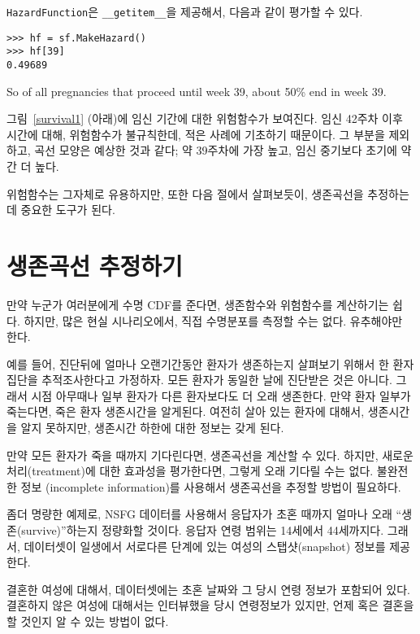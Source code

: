 {\tt HazardFunction}은 \verb"__getitem__"을 제공해서, 다음과 같이 평가할 수 있다.

\begin{verbatim}
>>> hf = sf.MakeHazard()
>>> hf[39]
0.49689
\end{verbatim}

So of all pregnancies that proceed until week 39, about
50\% end in week 39.

그림~\ref{survival1} (아래)에 임신 기간에 대한 위험함수가 보여진다.
임신 42주차 이후 시간에 대해, 위험함수가 불규칙한데, 적은 사례에 기초하기 때문이다. 그 부분을 제외하고, 곡선 모양은 예상한 것과 같다; 약 39주차에 가장 높고, 임신 중기보다 초기에 약간 더 높다.


위험함수는 그자체로 유용하지만, 또한 다음 절에서 살펴보듯이, 생존곡선을 추정하는데 중요한 도구가 된다.

\section{생존곡선 추정하기}

만약 누군가 여러분에게 수명 CDF를 준다면, 생존함수와 위험함수를 계산하기는 쉽다. 하지만, 많은 현실 시나리오에서, 직접 수명분포를 측정할 수는 없다.
유추해야만 한다.

예를 들어, 진단뒤에 얼마나 오랜기간동안 환자가 생존하는지 살펴보기 위해서 한 환자집단을 추적조사한다고 가정하자.
모든 환자가 동일한 날에 진단받은 것은 아니다. 그래서 시점 아무때나 일부 환자가 다른 환자보다도 더 오래 생존한다. 만약 환자 일부가 죽는다면, 죽은 환자 생존시간을 알게된다. 여전히 살아 있는 환자에 대해서, 생존시간을 알지 못하지만, 생존시간 하한에 대한 정보는 갖게 된다.

만약 모든 환자가 죽을 때까지 기다린다면, 생존곡선을 계산할 수 있다.
하지만, 새로운 처리(treatment)에 대한 효과성을 평가한다면, 그렇게 오래 기다릴 수는 없다. 불완전한 정보 (incomplete information)를 사용해서 생존곡선을 추정할 방법이 필요하다.

좀더 명량한 예제로, NSFG 데이터를 사용해서 응답자가 초혼 때까지 얼마나 오래 ``생존(survive)''하는지 정량화할 것이다. 
응답자 연령 범위는 14세에서 44세까지다. 그래서, 데이터셋이 일생에서 서로다른 단계에 있는 여성의 스탭샷(snapshot) 정보를 제공한다. 


결혼한 여성에 대해서, 데이터셋에는 초혼 날짜와 그 당시 연령 정보가 포함되어 있다. 결혼하지 않은 여성에 대해서는 인터뷰했을 당시 연령정보가 있지만, 언제 혹은 결혼을 할 것인지 알 수 있는 방법이 없다.

